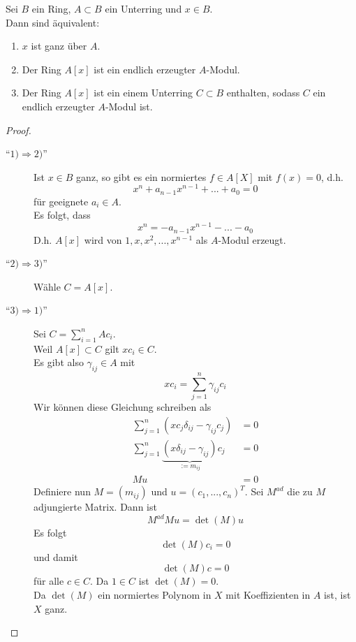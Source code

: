 	\begin{satz}
		Sei $B$ ein Ring, $A\subset B$ ein Unterring und $x\in B$.\\
		Dann sind äquivalent:
		\begin{enumerate}
			\item $x$ ist ganz über $A$.
			\item Der Ring $A[x]$ ist ein endlich erzeugter $A$-Modul.
			\item Der Ring $A[x]$ ist ein einem Unterring $C\subset B$ enthalten, sodass $C$ ein endlich erzeugter $A$-Modul ist.
		\end{enumerate}
	\end{satz}
	\begin{proof}
		\begin{description}
			\item[\enquote{$1)\Rightarrow2)$}] Ist $x\in B$ ganz, so gibt es ein normiertes $f\in A[X]$ mit $f(x)=0$, d.h.
			\[x^n+a_{n-1}x^{n-1}+...+a_0=0\]
			für geeignete $a_i\in A$.\\
			Es folgt, dass
			\[x^n=-a_{n-1}x^{n-1}-...-a_0\]
			D.h. $A[x]$ wird von $1,x,x^2,...,x^{n-1}$ als $A$-Modul erzeugt.
			\item[\enquote{$2)\Rightarrow3)$}]Wähle $C=A[x]$.
			\item[\enquote{$3)\Rightarrow1)$}] Sei $C=\sum_{i=1}^{n}Ac_i$.\\
			Weil $A[x]\subset C$ gilt $xc_i\in C$.\\
			Es gibt also $\gamma_{ij}\in A$ mit
			\[xc_{i}=\sum_{j=1}^{n}\gamma_{ij}c_i\]
			Wir können diese Gleichung schreiben als
			\begin{align*}
			\sum_{j=1}^{n}(xc_j\delta_{ij}-\gamma_{ij}c_j)&=0\\
			\sum_{j=1}^{n}\underbrace{(x\delta_{ij}-\gamma_{ij})}_{:=m_{ij}}c_j&=0\\
			Mu&=0
			\end{align*}
			Definiere nun $M=(m_{ij})$ und $u=(c_1,...,c_n)^T$.  Sei $M^{ad}$ die zu $M$ adjungierte Matrix. Dann ist
			\[M^{ad}Mu=\det(M)u\]
			Es folgt
			\[\det(M)c_i=0\]
			und damit
			\[\det(M)c=0\]
			für alle $c\in C$. Da $1\in C$ ist $\det(M)=0$.\\
			Da $\det(M)$ ein normiertes Polynom in $X$ mit Koeffizienten in $A$ ist, ist $X$ ganz.
		\end{description}
	\end{proof}

